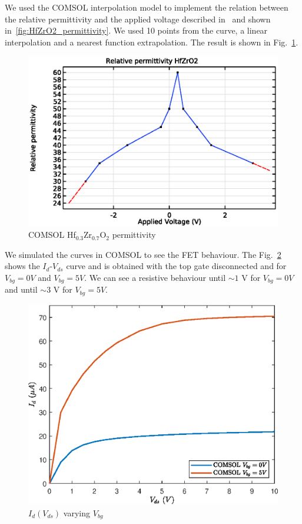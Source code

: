 \documentclass[12pt,a4paper,titlepage]{article}
\begin{document}
We used the COMSOL interpolation model to implement the relation between the relative permittivity and the applied voltage described in~\cite{Dragoman:ferroelectric} and shown in~\ref{fig:HfZrO2_permittivity}. We used 10 points from the curve, a linear interpolation and a nearest function extrapolation. The result is shown in Fig.~\ref{fig:permittivity_HfZrO2}.

\begin{figure}[h]
	\centering
	\includegraphics[width=.7\textwidth]{Grafici/permittivity_HfZrO2.eps} 
	\caption{COMSOL Hf$_{0.3}$Zr$_{0.7}$O$_2$ permittivity}
	\label{fig:permittivity_HfZrO2}
\end{figure}

We simulated the curves in COMSOL to see the FET behaviour. The Fig.~\ref{fig:HfZrO2_Id(Vd)_varying_Vbg} shows the $I_d$-$V_{ds}$ curve and is obtained with the top gate disconnected and for $V_{bg} = 0 V$ and $V_{bg} = 5 V$. We can see a resistive behaviour until $\sim1 $ V for $V_{bg} = 0 V$ and until $\sim3 $ V for $V_{bg} = 5 V$.
\begin{figure}[h]
	\centering
	\includegraphics[width=.8\textwidth]{Grafici/HfZrO2_Id(Vd)_varying_Vbg.eps} 
	\caption{$I_d(V_{ds})$ varying $V_{bg}$}
	\label{fig:HfZrO2_Id(Vd)_varying_Vbg}
\end{figure} 
\end{document}

